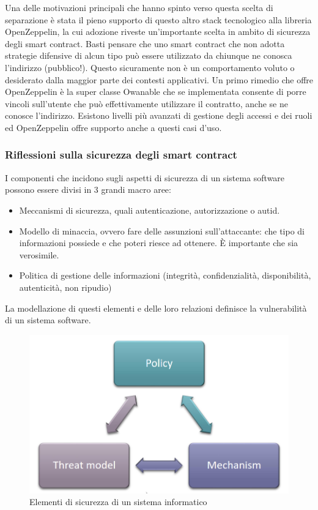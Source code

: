 \documentclass[a4paper,11pt]{article}
\begin{document}
Una delle motivazioni principali che hanno spinto verso questa scelta di separazione è stata il pieno supporto di questo altro stack tecnologico alla libreria OpenZeppelin, la cui adozione riveste un'importante scelta in ambito di sicurezza degli smart contract. Basti pensare che uno smart contract che non adotta strategie difensive di alcun tipo può essere utilizzato da chiunque ne conosca l'indirizzo (pubblico!). Questo sicuramente non è un comportamento voluto o desiderato dalla maggior parte dei contesti applicativi. Un primo rimedio che offre OpenZeppelin è la super classe Owanable che se implementata consente di porre vincoli sull'utente che può effettivamente utilizzare il contratto, anche se ne conosce l'indirizzo. Esistono livelli più avanzati di gestione degli accessi e dei ruoli ed OpenZeppelin offre supporto anche a questi casi d'uso.

\subsubsection{Riflessioni sulla sicurezza degli smart contract} \label{par:openzeppelin}

I componenti che incidono sugli aspetti di sicurezza di un sistema software possono essere divisi in 3 grandi macro aree: \cite{slideMetodi}

\begin{itemize}
    \item Meccanismi di sicurezza, quali autenticazione, autorizzazione o autid.
    \item Modello di minaccia, ovvero fare delle assunzioni sull'attaccante: che tipo di informazioni possiede e che poteri riesce ad ottenere. È importante che sia verosimile.
    \item Politica di gestione delle informazioni (integrità, confidenzialità, disponibilità, autenticità, non ripudio)
\end{itemize}

La modellazione di questi elementi e delle loro relazioni definisce la vulnerabilità di un sistema software.

\begin{figure}
    \centering
    \includegraphics[width=0.5\linewidth]{img/securityComponent.png}
    \caption{Elementi di sicurezza di un sistema informatico \cite{slideMetodi}}
    \label{fig:sec1}
\end{figure}
\end{document}
